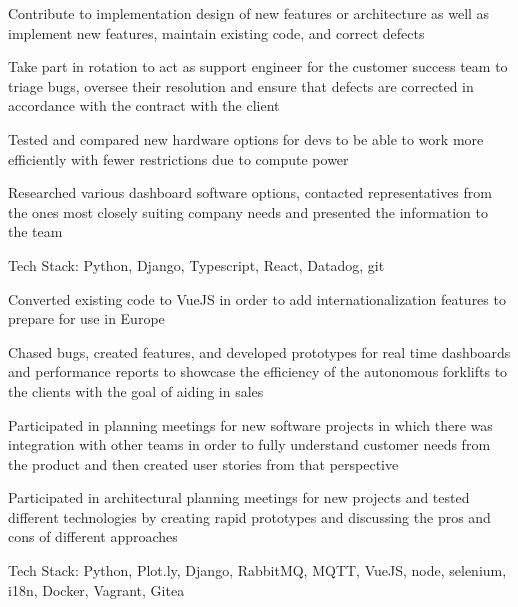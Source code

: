 \documentclass[letterpaper]{resume}
\begin{document}
\begin{compactitem}
\item Contribute to implementation design of new features or architecture as well as implement new features, maintain existing code, and correct defects
\item Take part in rotation to act as support engineer for the customer success team to triage bugs, oversee their resolution and ensure that defects are corrected in accordance with the contract with the client
\item Tested and compared new hardware options for devs to be able to work more efficiently with fewer restrictions due to compute power
\item Researched various dashboard software options, contacted representatives from the ones most closely suiting company needs and presented the information to the team
\item Tech Stack: Python, Django, Typescript, React, Datadog, git
\end{compactitem}

\begin{compactitem}
\item Converted existing code to VueJS in order to add internationalization features to prepare for use in Europe
\item Chased bugs, created features, and developed prototypes for real time dashboards and performance reports to showcase the efficiency of the autonomous forklifts to the clients with the goal of aiding in sales
\item Participated in planning meetings for new software projects in which there was integration with other teams in order to fully understand customer needs from the product and then created user stories from that perspective
\item Participated in architectural planning meetings for new projects and tested different technologies by creating rapid prototypes and discussing the pros and cons of different approaches
\item Tech Stack: Python, Plot.ly, Django, RabbitMQ, MQTT, VueJS, node, selenium, i18n, Docker, Vagrant, Gitea
\end{compactitem}
\end{document}
